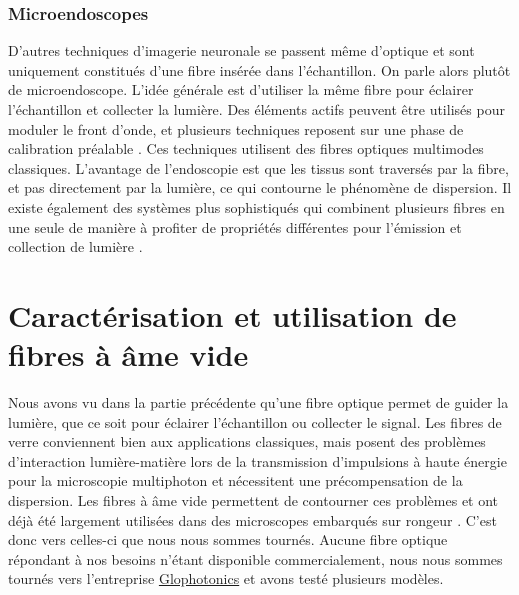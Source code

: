 \subsubsection{Microendoscopes}


D'autres techniques d'imagerie neuronale se passent même d'optique et sont uniquement constitués d'une fibre insérée dans l'échantillon. On parle alors plutôt de microendoscope. L'idée générale est d'utiliser la même fibre pour éclairer l'échantillon et collecter la lumière. Des éléments actifs peuvent être utilisés pour moduler le front d'onde, et plusieurs techniques reposent sur une phase de calibration préalable \cite{papadopoulos_high-resolution_2013}\cite{ohayon_minimally_2018}\cite{turtaev_high-fidelity_2018}. Ces techniques utilisent des fibres optiques multimodes classiques. L'avantage de l'endoscopie est que les tissus sont traversés par la fibre, et pas directement par la lumière, ce qui contourne le phénomène de dispersion. Il existe également des systèmes plus sophistiqués qui combinent plusieurs fibres en une seule de manière à profiter de propriétés différentes pour l'émission et collection de lumière \cite{andresen_two-photon_2013}\cite{kudlinski_double_2020}\cite{lombardini_high-resolution_2018}.

\section{Caractérisation et utilisation de fibres à âme vide}

Nous avons vu dans la partie précédente qu'une fibre optique permet de guider la lumière, que ce soit pour éclairer l'échantillon ou collecter le signal. Les fibres de verre conviennent bien aux applications classiques, mais posent des problèmes d'interaction lumière-matière lors de la transmission d'impulsions à haute énergie pour la microscopie multiphoton et nécessitent une précompensation de la dispersion. Les fibres à âme vide permettent de contourner ces problèmes et ont déjà été largement utilisées dans des microscopes embarqués sur rongeur \cite{tai_two-photon_2004} \cite{flusberg_vivo_2005} \cite{engelbrecht_ultra-compact_2008} \cite{piyawattanametha_vivo_2009} \cite{choi_improving_2014} \cite{klioutchnikov_three-photon_2020}. C'est donc vers celles-ci que nous nous sommes tournés. Aucune fibre optique répondant à nos besoins n'étant disponible commercialement, nous nous sommes tournés vers l'entreprise \href{http://www.glophotonics.fr/}{Glophotonics} et avons testé plusieurs modèles.

